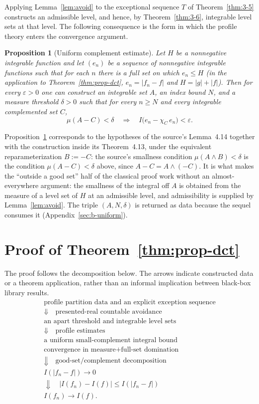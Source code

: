 \documentclass[11pt]{article}
\newtheorem{proposition}[theorem]{Proposition}
\theoremstyle{definition}
\theoremstyle{remark}
\begin{document}
Applying Lemma~\ref{lem:avoid} to the exceptional sequence $T$ of Theorem~\ref{thm:3-5} constructs an admissible level, and hence, by Theorem~\ref{thm:3-6}, integrable level sets at that level.  The following consequence is the form in which the profile theory enters the convergence argument.

\begin{proposition}[Uniform complement estimate]
\label{prop:uniform-complement}
Let $H$ be a nonnegative integrable function and let $(e_n)$ be a sequence of nonnegative integrable functions such that for each $n$ there is a full set on which $e_n\le H$ (in the application to Theorem~\ref{thm:prop-dct}, $e_n=|f_n-f|$ and $H=|g|+|f|$).  Then for every $\varepsilon>0$ one can construct an integrable set $A$, an index bound $N$, and a measure threshold $\delta>0$ such that for every $n\ge N$ and every integrable complemented set $C$,
\[
\mu(A-C)<\delta \quad\Longrightarrow\quad I\bigl(e_n-\chi_C\,e_n\bigr)<\varepsilon .
\]
\end{proposition}

Proposition~\ref{prop:uniform-complement} corresponds to the hypotheses of the source's Lemma~4.14 together with the construction inside its Theorem~4.13, under the equivalent reparameterization $B:=-C$: the source's smallness condition $\mu(A\wedge B)<\delta$ is the condition $\mu(A-C)<\delta$ above, since $A-C=A\wedge(-C)$.  It is what makes the ``outside a good set'' half of the classical proof work without an almost-everywhere argument: the smallness of the integral off $A$ is obtained from the measure of a level set of $H$ at an admissible level, and admissibility is supplied by Lemma~\ref{lem:avoid}.  The triple $(A,N,\delta)$ is returned as data because the sequel consumes it (Appendix~\ref{sec:b-uniform}).

\section{Proof of Theorem~\ref{thm:prop-dct}}
\label{sec:proof}

The proof follows the decomposition below.  The arrows indicate constructed data or a theorem application, rather than an informal implication between black-box library results.
\[
\begin{array}{c}
\text{profile partition data and an explicit exception sequence}\\
\Downarrow\quad\text{presented-real countable avoidance}\\
\text{an apart threshold and integrable level sets}\\
\Downarrow\quad\text{profile estimates}\\
\text{a uniform small-complement integral bound}\\[2mm]
\text{convergence in measure}+\text{full-set domination}\\
\Downarrow\quad\text{good-set/complement decomposition}\\
I(|f_n-f|)\longrightarrow 0\\
\Downarrow\quad |I(f_n)-I(f)|\leq I(|f_n-f|)\\
I(f_n)\longrightarrow I(f).
\end{array}
\]
\end{document}
